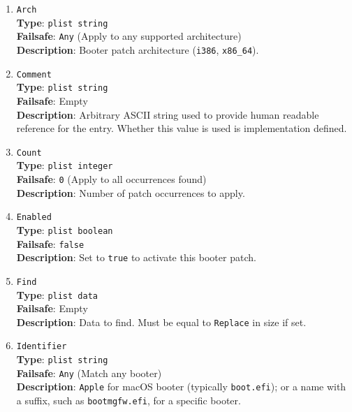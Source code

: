 \documentclass[]{article}
\begin{document}
\begin{enumerate}

\item
  \texttt{Arch}\\
  \textbf{Type}: \texttt{plist\ string}\\
  \textbf{Failsafe}: \texttt{Any} (Apply to any supported architecture)\\
  \textbf{Description}: Booter patch architecture (\texttt{i386}, \texttt{x86\_64}).

\item
  \texttt{Comment}\\
  \textbf{Type}: \texttt{plist\ string}\\
  \textbf{Failsafe}: Empty\\
  \textbf{Description}: Arbitrary ASCII string used to provide human readable
  reference for the entry. Whether this value is used is implementation defined.

\item
  \texttt{Count}\\
  \textbf{Type}: \texttt{plist\ integer}\\
  \textbf{Failsafe}: \texttt{0} (Apply to all occurrences found)\\
  \textbf{Description}: Number of patch occurrences to apply.

\item
  \texttt{Enabled}\\
  \textbf{Type}: \texttt{plist\ boolean}\\
  \textbf{Failsafe}: \texttt{false}\\
  \textbf{Description}: Set to \texttt{true} to activate this booter patch.

\item
  \texttt{Find}\\
  \textbf{Type}: \texttt{plist\ data}\\
  \textbf{Failsafe}: Empty\\
  \textbf{Description}: Data to find. Must be equal to \texttt{Replace} in size if set.

\item
  \texttt{Identifier}\\
  \textbf{Type}: \texttt{plist\ string}\\
  \textbf{Failsafe}:  \texttt{Any} (Match any booter)\\
  \textbf{Description}: \texttt{Apple} for macOS booter (typically \texttt{boot.efi});
  or a name with a suffix, such as \texttt{bootmgfw.efi}, for a specific booter.


\end{enumerate}
\end{document}
